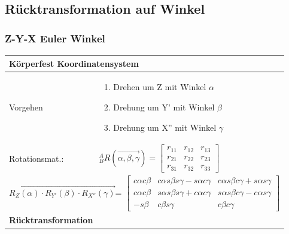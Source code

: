 \subsection{Rücktransformation auf Winkel}
	\begin{minipage}{9.5cm}
    \subsubsection{Z-Y-X Euler Winkel }
    \begin{tabular}{|p{2.5cm}|p{6cm}|}
        \hline
        \multicolumn{2}{|l|}{Körperfest Koordinatensystem}\\
        \hline
        Vorgehen&
        \vspace{-0.3cm}
        \begin{enumerate}
            \item Drehen um Z mit Winkel $\alpha$
            \item Drehung um Y' mit Winkel $\beta$
            \item Drehung um X'' mit Winkel $\gamma$\vspace{-0.5cm}
        \end{enumerate}\\
        \hline
        Rotationsmat.:
        & ${^A_B}R(\overrightarrow{\alpha,\beta,\gamma}) = 
        \begin{bmatrix} 
        r_{11} & r_{12} & r_{13} \\
        r_{21} & r_{22} & r_{23} \\
        r_{31} & r_{32} & r_{33}                              
        \end{bmatrix}$ \\
        \hline
        \multicolumn{2}{|l|}{{\footnotesize 
                $ \overrightarrow{R_Z(\alpha)\cdot R_{Y'}(\beta) \cdot R_{X''}(\gamma)}$= $\begin{bmatrix} 
                c\alpha c\beta & c\alpha s\beta s\gamma - s\alpha c\gamma & c\alpha s\beta c\gamma + s\alpha s\gamma \\
                c\alpha c\beta & s\alpha s\beta s\gamma + c\alpha c\gamma & s\alpha s\beta c\gamma - c\alpha s\gamma \\
                -s\beta & c\beta s\gamma & c\beta c\gamma                            
                \end{bmatrix}$
        }}\\\hline 
        \multicolumn{2}{|l|}{\textbf{Rücktransformation}}\\

\end{tabular}
\end{minipage}
